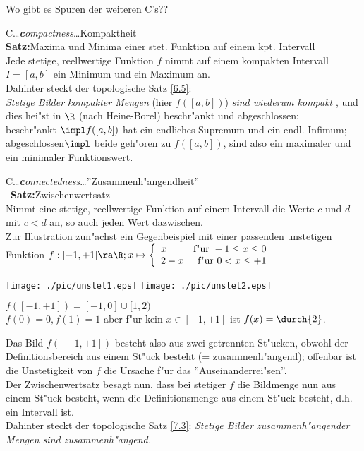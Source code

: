 Wo gibt es Spuren der weiteren C's??
\begin{description}
\item C\dots{\it {\bf c}ompactness}\dots Kompaktheit\\
{\bf Satz:}{Maxima und Minima einer stet. Funktion auf einem kpt. Intervall}\\
Jede stetige, reellwertige Funktion $f$ nimmt auf einem kompakten Intervall $I=[a,b]$ ein Minimum und ein Maximum an.\\
Dahinter steckt der topologische Satz \ref{6.5}:\\ {\it Stetige Bilder kompakter Mengen} (hier $f([a,b])$) {\it sind wiederum kompakt} , und dies hei"st in $\R$ (nach {\sc Heine-Borel})  beschr"ankt und abgeschlossen;\\ beschr"ankt $\impl f([a,b])$ hat ein endliches Supremum und ein endl. Infimum;\\ abgeschlossen$\impl$ beide geh"oren zu $f([a,b])$, sind also ein maximaler und ein minimaler Funktionswert.
\newpage
\item C\dots{\it {\bf c}onnectedness}\dots ''Zusammenh"angendheit''\\
 {\bf Satz:}{\sc Zwischenwertsatz}\\
Nimmt eine stetige, reellwertige Funktion auf einem Intervall die Werte $c$ und $d$ mit $c<d$ an, so auch jeden Wert dazwischen.\\
Zur Illustration zun"achst ein \ul{Gegenbeispiel} mit einer passenden \ul{unstetigen} Funktion $f:[-1,+1]\ra\R; x\mapsto\left\{\begin{array}{l r}
x& \mbox{f"ur }-1\leq x\leq0\\
2-x&\mbox{f"ur }0 < x\leq +1
\end{array}\right.$\\
\begin{center}
\texttt{[image: ./pic/unstet1.eps]}
\texttt{[image: ./pic/unstet2.eps]}
\end{center}
$f([-1,+1])=[-1,0]\cup [1,2)$\\
$f(0)=0, f(1)=1$ aber f"ur kein $x\in [-1,+1]$ ist $f(x)=\durch{2} $.
\end{description}
Das Bild $f([-1,+1])$ besteht also aus zwei getrennten St"ucken, obwohl der\\ Definitionsbereich aus einem St"uck besteht (= zusammenh"angend); offenbar ist die Unstetigkeit von $f$ die Ursache f"ur das ''Auseinanderrei"sen''.\\
Der {\sc Zwischenwertsatz} besagt nun, dass bei stetiger $f$ die Bildmenge nun aus\\ einem St"uck besteht, wenn die Definitionsmenge aus einem St"uck besteht, d.h. ein Intervall ist.\\
Dahinter steckt der topologische Satz \ref{7.3}: {\it Stetige Bilder zusammenh"angender Mengen sind zusammenh"angend.}
\newpage


